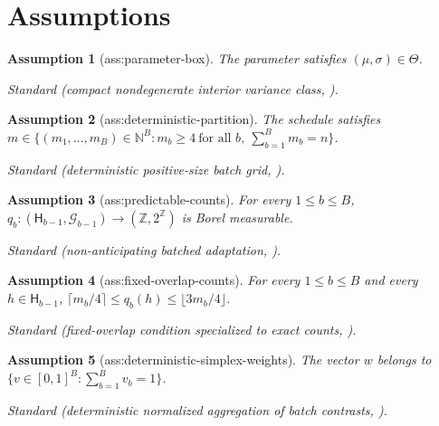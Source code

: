 \documentclass{article}
\newtheorem{assumption}{Assumption}
\begin{document}
\section{Assumptions}

\begin{assumption}[ass:parameter-box]\label{ass:parameter-box}
The parameter satisfies \((\mu,\sigma)\in\Theta\).
\par\smallskip\noindent\emph{Standard} (compact nondegenerate interior variance class, \cite{Yamin2026WhenHowPilot}).
\end{assumption}

\begin{assumption}[ass:deterministic-partition]\label{ass:deterministic-partition}
The schedule satisfies \(m\in\{(m_1,\ldots,m_B)\in\mathbb N^B:m_b\ge4\ \text{for all }b,\ \sum_{b=1}^B m_b=n\}\).
\par\smallskip\noindent\emph{Standard} (deterministic positive-size batch grid, \cite{PerchetRigolletChassangSnowberg2016Batched}).
\end{assumption}

\begin{assumption}[ass:predictable-counts]\label{ass:predictable-counts}
For every \(1\le b\le B\), \(q_b:(\mathsf H_{b-1},\mathcal G_{b-1})\to(\mathbb Z,2^{\mathbb Z})\) is Borel measurable.
\par\smallskip\noindent\emph{Standard} (non-anticipating batched adaptation, \cite{HiranoPorter2023SequentialRepresentations}).
\end{assumption}

\begin{assumption}[ass:fixed-overlap-counts]\label{ass:fixed-overlap-counts}
For every \(1\le b\le B\) and every \(h\in\mathsf H_{b-1}\), \(\lceil m_b/4\rceil\le q_b(h)\le\lfloor3m_b/4\rfloor\).
\par\smallskip\noindent\emph{Standard} (fixed-overlap condition specialized to exact counts, \cite{CookMishlerRamdas2024EfficientInference}).
\end{assumption}

\begin{assumption}[ass:deterministic-simplex-weights]\label{ass:deterministic-simplex-weights}
The vector \(w\) belongs to \(\{v\in[0,1]^B:\sum_{b=1}^Bv_b=1\}\).
\par\smallskip\noindent\emph{Standard} (deterministic normalized aggregation of batch contrasts, \cite{BlackwellPashleyValentino2023BANA}).
\end{assumption}
\end{document}
